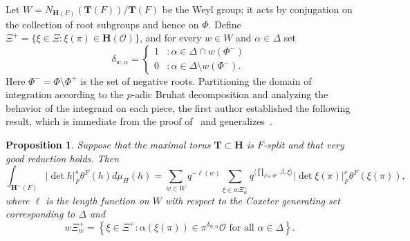 \documentclass[11pt,a4paper]{amsart}
\theoremstyle{plain}
\newtheorem{pro}[thm]{Proposition}
\theoremstyle{remark}
\begin{document}
Let $W = N_{\mathbf{H}(F)}(\mathbf{T}(F))/\mathbf{T}(F)$ be the Weyl group; it acts by conjugation on the collection of root subgroups and hence on $\Phi$.
Define $\Xi^+ = \{ \xi \in \Xi : \xi(\pi) \in \mathbf{H}(\mathcal{O}) \}$, and for every $w \in W$ and $\alpha \in \Delta$ set
\begin{equation*}
\delta_{w,\alpha} = \begin{cases}
1 &: \alpha \in \Delta \cap w(\Phi^-) \\
0 &: \alpha \in \Delta \setminus w(\Phi^-).
\end{cases}
\end{equation*}
Here $\Phi^- = \Phi \setminus \Phi^+$ is the set of negative roots.  
Partitioning the domain of integration according to the $p$-adic Bruhat decomposition and analyzing the behavior of the integrand on each piece, the first author established the following result, which is immediate from the proof of~\cite[Proposition~4.2]{Berman/11} and generalizes~\cite[(5.4)]{duSLubotzky/96}.

\begin{pro} \label{pro:bruhat.decomposition}
Suppose that the maximal torus $\mathbf{T} \subset \mathbf{H}$ is $F$-split and that very good reduction holds.   
Then
\begin{equation*}
\int_{\mathbf{H}^+(F)} | \det h |_F^s \theta^F (h) d \mu_H (h) = \sum_{w \in W} q^{- \ell (w)} \sum_{\xi \in w \Xi_w^+} q^{\langle \prod_{\beta \in \Phi^+} \beta, \xi \rangle} | \det \xi(\pi) |_F^s \theta^F (\xi(\pi)),
\end{equation*}
where $\ell$ is the length function on $W$ with respect to the Coxeter generating set corresponding to $\Delta$ and 
\begin{equation} \label{equ:wxi.dfn}
w \Xi_w^+ = \left\{ \xi \in \Xi^+ : 
\alpha(\xi(\pi)) \in \pi^{\delta_{w,\alpha}} \mathcal{O} \,\, \text{for all} \, \, \alpha \in \Delta \right\}.
\end{equation}
\end{pro}
\end{document}
